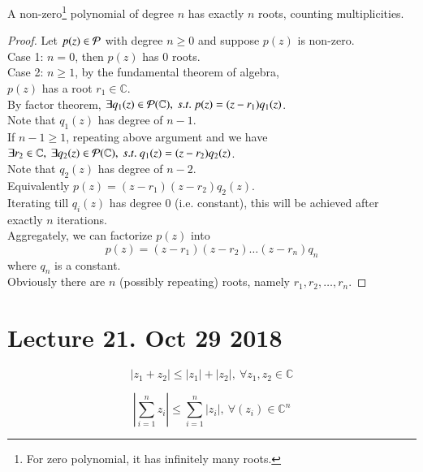 \documentclass[10pt]{article}
\begin{document}
	\begin{theorem}
		A non-zero\footnote{For zero polynomial, it has infinitely many roots.} polynomial of degree $n$ has exactly $n$ roots, counting multiplicities.
	\end{theorem}
	\begin{proof}
		Let $p(z) \in \mathcal{{P}}$ with degree $n \geq 0$ and suppose $p(z)$ is non-zero. \\
		Case 1: $n=0$, then $p(z)$ has 0 roots. \\
		Case 2: $n \geq 1$, by the fundamental theorem of algebra, \\
		$p(z)$ has a root $r_1 \in \mathbb{C}$. \\
		By factor theorem, $\exists q_1(z) \in \mathcal{{P}}(\mathbb{C}),\ s.t.\ p(z) = (z-r_1)q_1(z)$. \\
		Note that $q_1(z)$ has degree of $n-1$. \\
		If $n-1 \geq 1$, repeating above argument and we have \\
		$\exists r_2 \in \mathbb{C},\ \exists q_2(z) \in \mathcal{{P}}(\mathbb{C}),\ s.t.\ q_1(z) = (z-r_2)q_2(z)$. \\
		Note that $q_2(z)$ has degree of $n-2$. \\
		Equivalently $p(z) = (z-r_1)(z-r_2)q_2(z)$. \\
		Iterating till $q_i(z)$ has degree 0 (i.e. constant), this will be achieved after exactly $n$ iterations. \\
		Aggregately, we can factorize $p(z)$ into 
		\[
			p(z) = (z-r_1)(z-r_2)\dots(z-r_n)q_n
		\]
		where $q_n$ is a constant. \\
		Obviously there are $n$ (possibly repeating) roots, namely $r_1, r_2, \dots, r_n$.
	\end{proof}

	\section{Lecture 21. Oct 29 2018}
		\begin{lemma}
			\[
				|z_1 + z_2| \leq |z_1| + |z_2|,\ \forall z_1, z_2 \in \mathbb{C}
			\]
		\end{lemma}

		\begin{lemma}
			\[
				| \sum_{i=1}^{n} {z_i} | \leq \sum_{i=1}^{n} |z_i|,\ \forall (z_i) \in \mathbb{C}^n
			\]
		\end{lemma}
\end{document}

